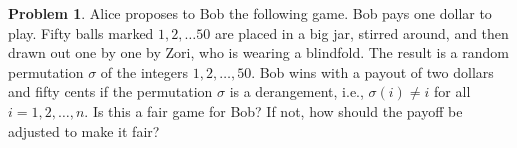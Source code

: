 \documentclass[12pt]{article}
\newcounter{chapternumber}
\theoremstyle{definition}
\newtheorem{problem-internal}{Problem}[chapternumber]
\newenvironment{problem}{
  \medskip
  \begin{problem-internal}
}{
\end{problem-internal}
}
\begin{document}
  \begin{problem}
    Alice proposes to Bob the following game. Bob pays one dollar to play.
    Fifty balls marked \(1, 2, \ldots 50\) are placed in a big jar, stirred around, and then drawn out one by one by Zori, who is wearing a blindfold.
    The result is a random permutation \(\sigma\) of the integers \(1, 2, \ldots, 50\).
    Bob wins with a payout of two dollars and fifty cents if the permutation \(\sigma\) is a derangement, i.e., \(\sigma(i) \neq i\) for all \(i = 1, 2, \ldots, n\).
    Is this a fair game for Bob? If not, how should the payoff be adjusted to make it fair?
  \end{problem}
\end{document}
